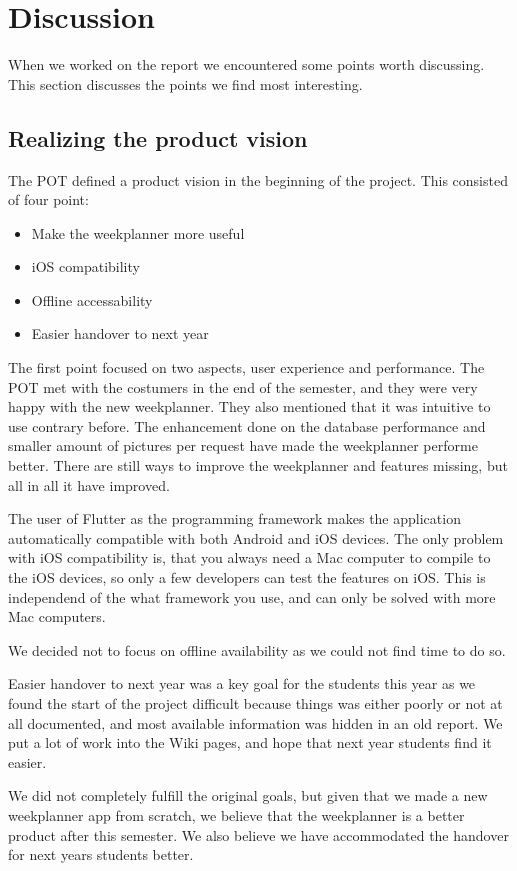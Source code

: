 \section{Discussion}

When we worked on the report we encountered some points worth discussing. This section discusses the points we find most interesting. 

\subsection{Realizing the product vision}
The \gls{POT} defined a product vision in the beginning of the project. This consisted of four point:
\begin{itemize}
    \item Make the weekplanner more useful
    \item iOS compatibility
    \item Offline accessability
    \item Easier handover to next year
\end{itemize}
The first point focused on two aspects, user experience and performance. The \gls{POT} met with the costumers in the end of the semester, and they were very happy with the new weekplanner. They also mentioned that it was intuitive to use contrary before. The enhancement done on the database performance and smaller amount of pictures per request have made the weekplanner performe better. There are still ways to improve the weekplanner and features missing, but all in all it have improved.

The user of Flutter as the programming framework makes the application automatically compatible with both Android and iOS devices. The only problem with iOS compatibility is, that you always need a Mac computer to compile to the iOS devices, so only a few developers can test the features on iOS. This is independend of the what framework you use, and can only be solved with more Mac computers.

We decided not to focus on offline availability as we could not find time to do so.

Easier handover to next year was a key goal for the students this year as we found the start of the project difficult because things was either poorly or not at all documented, and most available information was hidden in an old report. We put a lot of work into the Wiki pages, and hope that next year students find it easier.

We did not completely fulfill the original goals, but given that we made a new weekplanner app from scratch, we believe that the weekplanner is a better product after this semester. We also believe we have accommodated the handover for next years students better.

